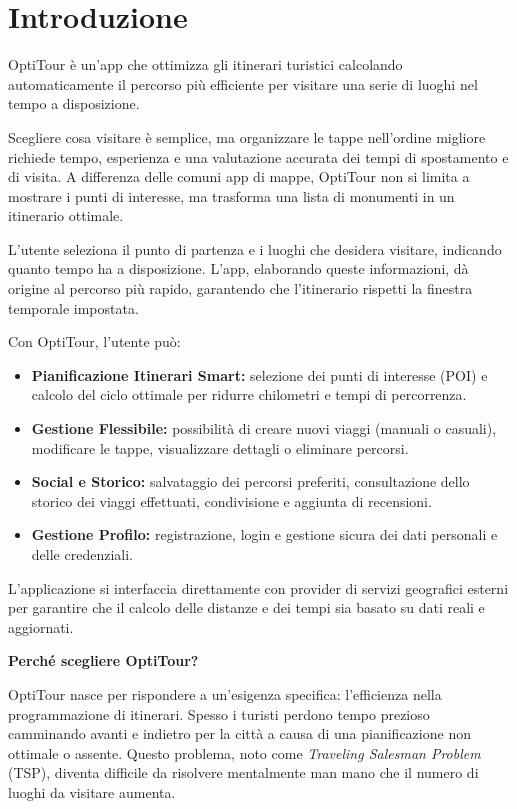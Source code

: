 \section{Introduzione}

OptiTour è un'app che ottimizza gli itinerari turistici calcolando automaticamente il percorso più efficiente per visitare una serie di luoghi nel tempo a disposizione.

Scegliere cosa visitare è semplice, ma organizzare le tappe nell'ordine migliore richiede tempo, esperienza e una valutazione accurata dei tempi di spostamento e di visita. A differenza delle comuni app di mappe, OptiTour non si limita a mostrare i punti di interesse, ma trasforma una lista di monumenti in un itinerario ottimale.

L'utente seleziona il punto di partenza e i luoghi che desidera visitare, indicando quanto tempo ha a disposizione. L'app, elaborando queste informazioni, dà origine al percorso più rapido, garantendo che l'itinerario rispetti la finestra temporale impostata.

\vspace{9pt}
Con OptiTour, l'utente può:
\begin{itemize}
    \item \textbf{Pianificazione Itinerari Smart:} selezione dei punti di interesse (POI) e calcolo del ciclo ottimale per ridurre chilometri e tempi di percorrenza.
    \item \textbf{Gestione Flessibile:} possibilità di creare nuovi viaggi (manuali o casuali), modificare le tappe, visualizzare dettagli o eliminare percorsi.
    \item \textbf{Social e Storico:} salvataggio dei percorsi preferiti, consultazione dello storico dei viaggi effettuati, condivisione e aggiunta di recensioni.
    \item \textbf{Gestione Profilo:} registrazione, login e gestione sicura dei dati personali e delle credenziali.
\end{itemize}

L'applicazione si interfaccia direttamente con provider di servizi geografici esterni per garantire che il calcolo delle distanze e dei tempi sia basato su dati reali e aggiornati.

\vspace{1cm}

\textbf{Perché scegliere OptiTour?}

\medskip

OptiTour nasce per rispondere a un'esigenza specifica: l'efficienza nella programmazione di itinerari. Spesso i turisti perdono tempo prezioso camminando avanti e indietro per la città a causa di una pianificazione non ottimale o assente. Questo problema, noto come \textit{Traveling Salesman Problem} (TSP), diventa difficile da risolvere mentalmente man mano che il numero di luoghi da visitare aumenta.

